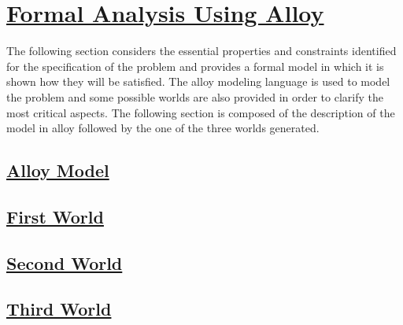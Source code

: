 \section[Formal Analysis Using Alloy]{\hyperlink{toc}{Formal Analysis Using Alloy}}
	\label{sec:formalAnalysisUsingAlloy}
	The following section considers the essential properties and constraints identified for the specification of the problem and provides a formal model in which it is shown how they will be satisfied. The alloy modeling language is used to model the problem and some possible worlds are also provided in order to clarify the most critical aspects. 
	The following section is composed of the description of the model in alloy followed by the one of the three worlds generated.
	
	\subsection[Alloy Model]{\hyperlink{toc}{Alloy Model}}
	
	
	\subsection[First World]{\hyperlink{toc}{First World}}
	
	\subsection[Second World]{\hyperlink{toc}{Second World}}
	
	\subsection[Third World]{\hyperlink{toc}{Third World}}
